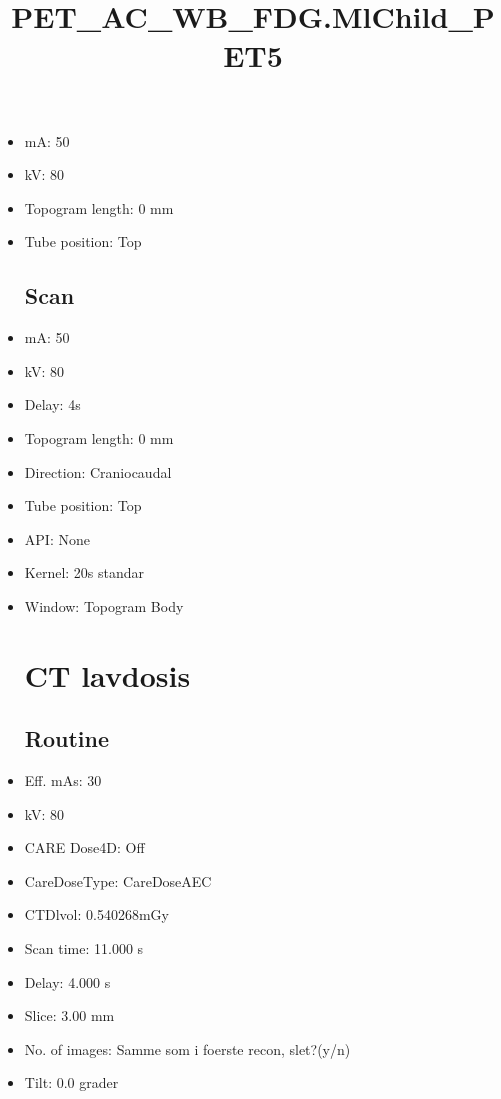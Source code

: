 \documentclass[12pt]{article}
\title{PET\_AC\_WB\_FDG.MlChild\_PET5}
\begin{document}
\maketitle
\newpage
\tableofcontents
\newpage
{}


\begin{itemize}\section{Topogram}
\subsection{Routine}
\item mA: 50\item kV: 80\item Topogram length: 0 mm\item Tube position: Top
\subsection{Scan}\item mA: 50\item kV: 80\item Delay: 4s\item Topogram length: 0 mm\item Direction: Craniocaudal\item Tube position: Top\item API: None\item Kernel: 20s standar\item Window: Topogram Body
\section{CT lavdosis}
\subsection{Routine}
\item Eff. mAs: 30\item kV: 80\item CARE Dose4D: Off\item CareDoseType: CareDoseAEC\item CTDlvol: 0.540268mGy\item Scan time: 11.000 s\item Delay: 4.000 s\item Slice: 3.00 mm\item No. of images: Samme som i foerste recon, slet?(y/n)\item Tilt: 0.0 grader

\end{itemize}
\end{document}
